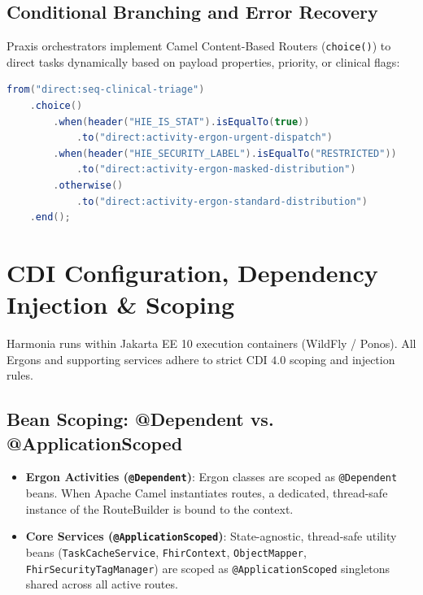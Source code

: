 \subsection{Conditional Branching and Error Recovery}

Praxis orchestrators implement Camel Content-Based Routers (\texttt{choice()}) to direct tasks dynamically based on payload properties, priority, or clinical flags:

\begin{lstlisting}[language=Java, caption={Content-Based Routing in Praxis}]
from("direct:seq-clinical-triage")
    .choice()
        .when(header("HIE_IS_STAT").isEqualTo(true))
            .to("direct:activity-ergon-urgent-dispatch")
        .when(header("HIE_SECURITY_LABEL").isEqualTo("RESTRICTED"))
            .to("direct:activity-ergon-masked-distribution")
        .otherwise()
            .to("direct:activity-ergon-standard-distribution")
    .end();
\end{lstlisting}

\section{CDI Configuration, Dependency Injection \& Scoping}
\label{sec:ergon_cdi}

Harmonia runs within Jakarta EE 10 execution containers (WildFly / Ponos). All Ergons and supporting services adhere to strict CDI $4.0$ scoping and injection rules.

\subsection{Bean Scoping: @Dependent vs. @ApplicationScoped}

\begin{itemize}
    \item \textbf{Ergon Activities (\texttt{@Dependent})}: Ergon classes are scoped as \texttt{@Dependent} beans. When Apache Camel instantiates routes, a dedicated, thread-safe instance of the RouteBuilder is bound to the context.
    \item \textbf{Core Services (\texttt{@ApplicationScoped})}: State-agnostic, thread-safe utility beans (\texttt{TaskCacheService}, \texttt{FhirContext}, \texttt{ObjectMapper}, \texttt{FhirSecurityTagManager}) are scoped as \texttt{@ApplicationScoped} singletons shared across all active routes.
\end{itemize}


